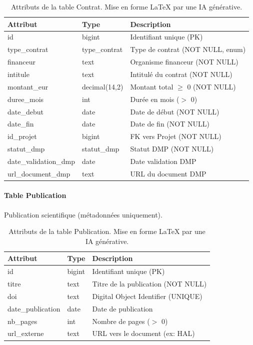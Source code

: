 \documentclass[12pt,a4paper]{article}
\begin{document}
\begin{table}[H]
\centering
\small
\begin{tabular}{@{}llp{5cm}@{}}
\toprule
\textbf{Attribut} & \textbf{Type} & \textbf{Description} \\ \midrule
id & bigint & Identifiant unique (PK) \\
type\_contrat & type\_contrat & Type de contrat (NOT NULL, enum) \\
financeur & text & Organisme financeur (NOT NULL) \\
intitule & text & Intitulé du contrat (NOT NULL) \\
montant\_eur & decimal(14,2) & Montant total $\geq$ 0 (NOT NULL) \\
duree\_mois & int & Durée en mois ($>$ 0) \\
date\_debut & date & Date de début (NOT NULL) \\
date\_fin & date & Date de fin (NOT NULL) \\
id\_projet & bigint & FK vers Projet (NOT NULL) \\
statut\_dmp & statut\_dmp & Statut DMP (NOT NULL) \\
date\_validation\_dmp & date & Date validation DMP \\
url\_document\_dmp & text & URL du document DMP \\ \bottomrule
\end{tabular}
\caption{Attributs de la table Contrat. Mise en forme LaTeX par une IA générative.}
\end{table}

\paragraph{Table Publication}
Publication scientifique (métadonnées uniquement).

\begin{table}[H]
\centering
\small
\begin{tabular}{@{}llp{6cm}@{}}
\toprule
\textbf{Attribut} & \textbf{Type} & \textbf{Description} \\ \midrule
id & bigint & Identifiant unique (PK) \\
titre & text & Titre de la publication (NOT NULL) \\
doi & text & Digital Object Identifier (UNIQUE) \\
date\_publication & date & Date de publication \\
nb\_pages & int & Nombre de pages ($>$ 0) \\
url\_externe & text & URL vers le document (ex: HAL) \\ \bottomrule
\end{tabular}
\caption{Attributs de la table Publication. Mise en forme LaTeX par une IA générative.}
\end{table}
\end{document}
